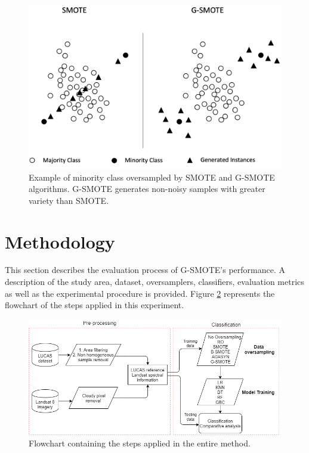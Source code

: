 \documentclass[remotesensing,article,submit,moreauthors,pdftex]{Definitions/mdpi}
\begin{document}
\begin{figure}[H]
	\centering
	\includegraphics[width=1\linewidth]{../analysis/smote_vs_gsmote}
	\caption{Example of minority class oversampled by SMOTE and G-SMOTE
		algorithms. G-SMOTE generates non-noisy samples
		with greater variety than SMOTE.}
	\label{fig:gsmote_smote}
\end{figure}

\section{Methodology}

This section describes the evaluation process of G-SMOTE's performance. A
description of the study area, dataset, oversamplers, classifiers, evaluation
metrics as well as the experimental procedure is provided. Figure
\ref{fig:flowchart} represents the flowchart of the steps applied in this
experiment.

\begin{figure}[H]
	\centering
	\includegraphics[width=1\linewidth]{../analysis/experiment_flow_chart}
	\caption{Flowchart containing the steps applied in the entire method.}
	\label{fig:flowchart}
\end{figure}
\end{document}
